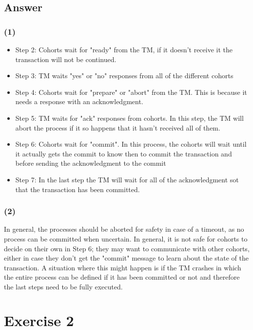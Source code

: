 \documentclass{article}
\begin{document}
\subsection*{Answer}
\subsubsection*{(1)}
\begin{itemize}
    \item Step 2: Cohorts wait for "ready" from the TM, if it doesn't receive it the transaction will not be continued.
    \item Step 3: TM waits "yes" or "no" responses from all of the different cohorts
    \item Step 4: Cohorts wait for "prepare" or "abort" from the TM. This is because it needs a response with an acknowledgment.
    \item Step 5: TM waits for "ack" responses from cohorts. In this step, the TM will abort the process if it so happens that it hasn't received all of them.
    \item Step 6: Cohorts wait for "commit". In this process, the cohorts will wait until it actually gets the commit to know then to commit the transaction and before sending the acknowledgment to the commit
    \item Step 7: In the last step the TM will wait for all of the acknowledgment sot that the transaction has been committed.
\end{itemize}

\subsubsection*{(2)}
In general, the processes should be aborted for safety in case of a timeout, as no process can be committed when uncertain. In general, it is not safe for cohorts to decide on their own in Step 6; they may want to communicate with other cohorts, either in case they don't get the "commit" message to learn about the state of the transaction. A situation where this might happen is if the TM crashes in which the entire process can be defined if it has been committed or not and therefore the last steps need to be fully executed.








\section*{Exercise 2}
\end{document}

